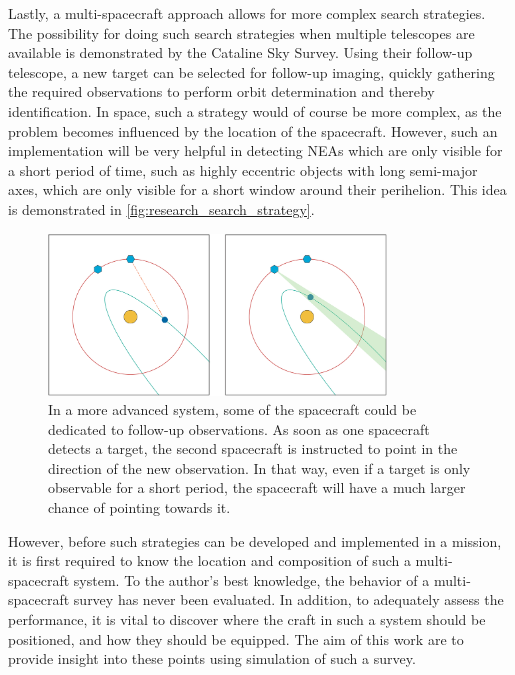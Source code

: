 Lastly, a multi-spacecraft approach allows for more complex search strategies. The possibility for doing such search strategies when multiple telescopes are available is demonstrated by the Cataline Sky Survey. Using their follow-up telescope, a new target can be selected for follow-up imaging, quickly gathering the required observations to perform orbit determination and thereby identification. In space, such a strategy would of course be more complex, as the problem becomes influenced by the location of the spacecraft. However, such an implementation will be very helpful in detecting NEAs which are only visible for a short period of time, such as highly eccentric objects with long semi-major axes, which are only visible for a short window around their perihelion. This idea is demonstrated in \autoref{fig:research_search_strategy}.\\

\begin{figure}[htbp]
 \centering
 \includegraphics[width=0.8\textwidth]{img/research_search_strategy.png}
 \caption{In a more advanced system, some of the spacecraft could be dedicated to follow-up observations. As soon as one spacecraft detects a target, the second spacecraft is instructed to point in the direction of the new observation. In that way, even if a target is only observable for a short period, the spacecraft will have a much larger chance of pointing towards it.}
 \label{fig:research_search_strategy}
\end{figure}


However, before such strategies can be developed and implemented in a mission, it is first required to know the location and composition of such a multi-spacecraft system. To the author's best knowledge, the behavior of a multi-spacecraft survey has never been evaluated. In addition, to adequately assess the performance, it is vital to discover where the craft in such a system should be positioned, and how they should be equipped. The aim of this work are to provide insight into these points using simulation of such a survey.

